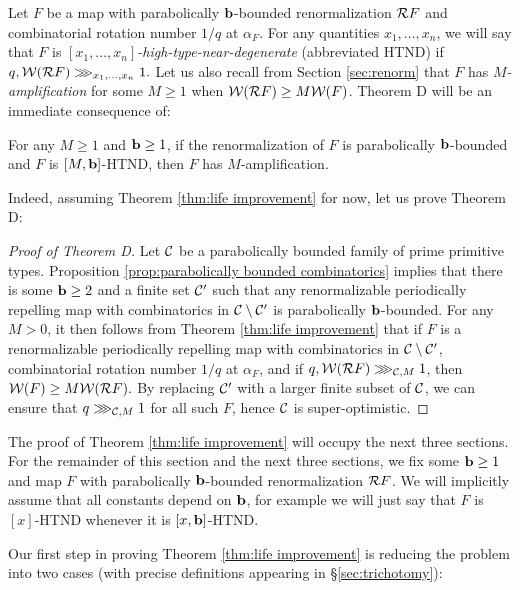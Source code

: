 \documentclass[12pt]{amsart}
\begin{document}
Let $F$ be a \pql map with parabolically $\mathbf b$-bounded renormalization $\mathcal R F$ and combinatorial rotation number $1/q$ at $\alpha_F$. For any quantities $x_1, \dots, x_n$, we will say that $F$ is  \textit{$[x_1, \dots, x_n]$-high-type-near-degenerate} (abbreviated HTND) if $q, \mathcal W(\mathcal R F)\ggg_{x_1, \dots, x_n} 1.$ Let us also recall from Section \ref{sec:renorm} that $F$ has \emph{$M$-amplification} for some $M\geq 1$ when $\mathcal W(\mathcal R F)\geq M\mathcal W(F)$.
Theorem D will be an immediate consequence of:
\begin{theorem}\label{thm:life improvement}
For any $M \geq 1$ and $\mathbf b\geq 1$, if the renormalization of $F$  is {parabolically $\mathbf b$-bounded} and $F$ is $[M, \mathbf b]$-HTND, then $F$ has $M$-amplification.
\end{theorem} 

Indeed, assuming Theorem \ref{thm:life improvement} for now, let us prove Theorem D:
\begin{proof}[Proof of Theorem D]
	Let $\mathcal C$ be a parabolically bounded family of prime primitive types.
  Proposition \ref{prop:parabolically bounded combinatorics} implies that there is some $\mathbf b\geq 2$ and a finite set $\mathcal C'$ such that any renormalizable periodically repelling \pql map with combinatorics in $\mathcal C\setminus \mathcal C'$ is parabolically $\mathbf b$-bounded. 
 For any $M> 0$, it then follows from Theorem \ref{thm:life improvement} that if $F$ is a renormalizable periodically repelling \pql map with combinatorics in $\mathcal C\setminus \mathcal C'$, combinatorial rotation number $1/q$ at $\alpha_F$, and if $q, \mathcal W(\mathcal R F)\ggg_{\mathcal C, M} 1$, then $\mathcal W(F)\geq M\mathcal W(\mathcal R F).$ By replacing $\mathcal C'$ with a larger finite subset of $\mathcal C$, we can ensure that $q\ggg_{\mathcal C, M} 1$ for all such $F$, hence $\mathcal C$ is super-optimistic.	
\end{proof}



The proof of Theorem \ref{thm:life improvement} will occupy the next three sections. For the remainder of this section and the next three sections, we fix some  $\mathbf b\geq 1$ and \pql map $F$ with parabolically $\mathbf b$-bounded renormalization $\mathcal R F$.
We will implicitly assume that all constants depend on $\mathbf b$, for example 
we will just say that $F$ is $[x]$-HTND whenever it is $[x, \mathbf b]$-HTND.



Our first step in proving Theorem \ref{thm:life improvement} is reducing the problem into two cases (with precise definitions appearing in \S\ref{sec:trichotomy}):
\end{document}
